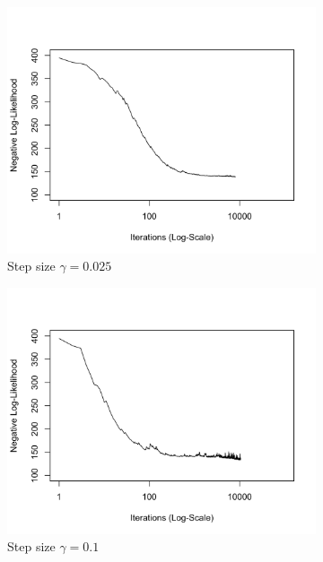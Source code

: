 \documentclass[11 pt]{article}
\begin{document}
\begin{enumerate}[label=(\Alph*)]
\begin{figure}[H]
\begin{center}
\begin{subfigure}[h]{0.45\linewidth}
			\includegraphics[width=\linewidth]{Fig/F1PC0025.png}
			\caption{Step size $\gamma=0.025$}
		\end{subfigure}
		\begin{subfigure}[h]{0.45\linewidth}
			\includegraphics[width=\linewidth]{Fig/F1PC01.png}
			\caption{Step size $\gamma=0.1$}
		\end{subfigure}
		\begin{subfigure}[h]{0.45\linewidth}

\end{subfigure}
\end{center}
\end{figure}
\end{enumerate}
\end{document}
